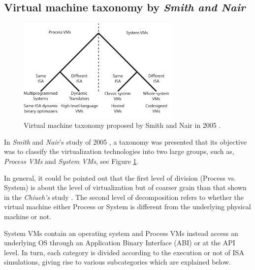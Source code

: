 	\subsection{Virtual machine taxonomy by \textit{Smith and Nair}}

	\begin{figure}[H]
		\centering
		\includegraphics[width=8cm]{images/Smith2005.pdf}
		\vspace{-0.2cm}
		\caption{Virtual machine taxonomy proposed by Smith and Nair in 2005 \cite{Smith2005}.}
		\label{fig:VMTaxonomySmithNair2005}
	\end{figure}
	
	In \textit{Smith} and \textit{Nair}'s study of 2005 \cite {Smith2005}, a taxonomy was presented that its objective was to classify the virtualization technologies into two large groups, such as, \textit{Process VMs} and \textit{System VMs}, see Figure \ref{fig:VMTaxonomySmithNair2005}. 
	
	 In general, it could be pointed out that the first level of division (Process vs. System) is about the level of virtualization but of coarser grain than that shown in the \textit{Chiueh's} study \cite{Chiueh2005}. The second level of decomposition refers to whether the virtual machine either Process or System is different from the underlying physical machine or not. 
    
    System VMs contain an operating system and Process VMs instead access an underlying OS through an Application Binary Interface (ABI) or at the API level. In turn, each category is divided according to the execution or not of ISA simulations, giving rise to various subcategories which are explained below.
	
    
    
